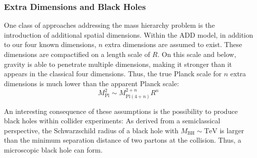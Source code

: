 \subsubsection{Extra Dimensions and Black Holes}
One class of approaches addressing the mass hierarchy problem is the introduction of additional spatial dimensions. Within the \acf{ADD} model\cite{Arkani-Hamed:Hierarchyproblemnew}, in addition to our four known dimensions, $n$ extra dimensions are assumed to exist. These dimensions are compactified on a length scale of $R$. On this scale and below, gravity is able to penetrate multiple dimensions, making it stronger than it appears in the classical four dimensions. Thus, the true Planck scale for $n$ extra dimensions is much lower than the apparent Planck scale:
\begin{equation}
    M_\text{Pl}^2 \sim M_{\text{Pl}(4+n)}^{2+n} R^n
\end{equation}

An interesting consequence of these assumptions is the possibility to produce black holes within collider experiments\cite{Dimopoulos:BlackHolesLHCa}: As derived from a semiclassical perspective, the Schwarzschild radius of a black hole with $M_\text{BH} \sim \si{\TeV}$ is larger than the minimum separation distance of two partons at the collision. Thus, a microscopic black hole can form.

